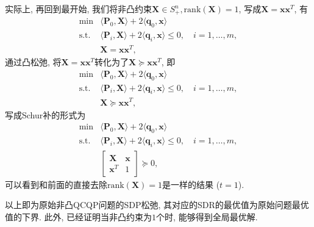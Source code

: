 \documentclass{article}
\begin{document}
实际上, 再回到最开始, 我们将非凸约束$\bm{X} \in S^n_{+}, \text{rank}(\bm{X})=1$, 写成$\bm{X} = \bm{x}\bm{x}^T$, 有 
\begin{equation}
\begin{array}{cl}
{\min} & {\langle \bm{P}_0,\bm{X}\rangle + 2 \langle \bm{q}_0,\bm{x} \rangle} \\
{\text{s.t.}} & {\langle \bm{P}_i,\bm{X} \rangle + 2 \langle \bm{q}_i,\bm{x} \rangle \leq 0,\quad i=1,\dots,m}, \\
{} & {\bm{X} = \bm{x}\bm{x}^T},
\end{array}
\end{equation}
通过凸松弛, 将$\bm{X} = \bm{x}\bm{x}^T$转化为了$\bm{X} \succeq \bm{x}\bm{x}^T$, 即
\begin{equation}
\begin{array}{cl}
{\min} & {\langle \bm{P}_0,\bm{X}\rangle + 2 \langle \bm{q}_0,\bm{x} \rangle} \\
{\text{s.t.}} & {\langle \bm{P}_i,\bm{X} \rangle + 2 \langle \bm{q}_i,\bm{x} \rangle \leq 0,\quad i=1,\dots,m}, \\
{} & {\bm{X} \succeq \bm{x}\bm{x}^T},
\end{array}
\end{equation}
写成Schur补的形式为
\begin{equation}
\begin{array}{cl}
{\min} & {\langle \bm{P}_0,\bm{X}\rangle + 2 \langle \bm{q}_0,\bm{x} \rangle} \\
{\text{s.t.}} & {\langle \bm{P}_i,\bm{X} \rangle + 2 \langle \bm{q}_i,\bm{x} \rangle \leq 0,\quad i=1,\dots,m}, \\
{} & {{\begin{bmatrix} {\bm{X}} & {\bm{x}} \\ {\bm{x}^T} & 1 \end{bmatrix}} \succeq 0},
\end{array}
\end{equation}
可以看到和前面的直接去除$\text{rank}(\bm{X})=1$是一样的结果 ($t=1$).

以上即为原始非凸QCQP问题的SDP松弛, 其对应的SDR的最优值为原始问题最优值的下界. 
此外, 已经证明当非凸约束为$1$个时, 能够得到全局最优解.


\end{document}
